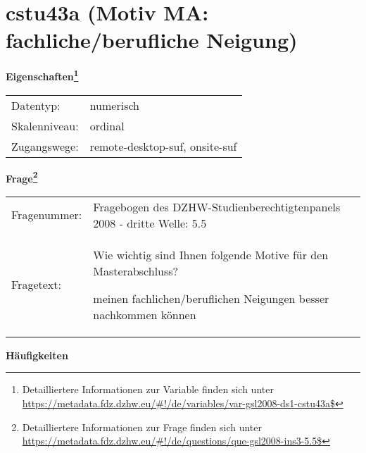 
    \setcounter{footnote}{0}

    \vspace*{-1.8cm}
	\section{cstu43a (Motiv MA: fachliche/berufliche Neigung)}
	\label{section:cstu43a}



    \vspace*{0.5cm}
    \noindent\textbf{Eigenschaften\footnote{Detailliertere Informationen zur Variable finden sich unter
		\url{https://metadata.fdz.dzhw.eu/\#!/de/variables/var-gsl2008-ds1-cstu43a$}}}\\
	\begin{tabularx}{\hsize}{@{}lX}
	Datentyp: & numerisch \\
	Skalenniveau: & ordinal \\
	Zugangswege: &
	  remote-desktop-suf, 
	  onsite-suf
 \\
    \end{tabularx}



				\vspace*{0.5cm}
                \noindent\textbf{Frage\footnote{Detailliertere Informationen zur Frage finden sich unter
		              \url{https://metadata.fdz.dzhw.eu/\#!/de/questions/que-gsl2008-ins3-5.5$}}}\\
				\begin{tabularx}{\hsize}{@{}lX}
					Fragenummer: &
					  Fragebogen des DZHW-Studienberechtigtenpanels 2008 - dritte Welle:
					  5.5
 \\
					Fragetext: & Wie wichtig sind Ihnen folgende Motive für den Masterabschluss?\par  meinen fachlichen/beruflichen Neigungen besser nachkommen können \\
				\end{tabularx}





        		\vspace*{0.5cm}
                \noindent\textbf{Häufigkeiten}

